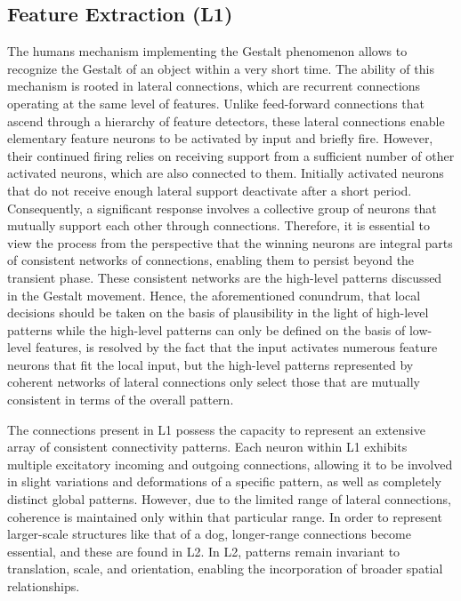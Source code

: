 \subsection{Feature Extraction (L1)}
The humans mechanism implementing the Gestalt phenomenon allows to recognize the Gestalt of an object within a very short time. The ability of this mechanism is rooted in lateral connections, which are recurrent connections operating at the same level of features. Unlike feed-forward connections that ascend through a hierarchy of feature detectors, these lateral connections enable elementary feature neurons to be activated by input and briefly fire. However, their continued firing relies on receiving support from a sufficient number of other activated neurons, which are also connected to them. Initially activated neurons that do not receive enough lateral support deactivate after a short period. Consequently, a significant response involves a collective group of neurons that mutually support each other through connections. Therefore, it is essential to view the process from the perspective that the winning neurons are integral parts of consistent networks of connections, enabling them to persist beyond the transient phase. These consistent networks are the high-level patterns discussed in the Gestalt movement. Hence, the aforementioned  conundrum, that local decisions should be taken on the basis of plausibility in the light of high-level patterns while the high-level patterns can only be defined on the basis of low-level features, is resolved by the fact that the input activates numerous feature neurons that fit the local input, but the high-level patterns represented by coherent networks of lateral connections only select those that are mutually consistent in terms of the overall pattern.

The connections present in L1 possess the capacity to represent an extensive array of consistent connectivity patterns. Each neuron within L1 exhibits multiple excitatory incoming and outgoing connections, allowing it to be involved in slight variations and deformations of a specific pattern, as well as completely distinct global patterns. However, due to the limited range of lateral connections, coherence is maintained only within that particular range. In order to represent larger-scale structures like that of a dog, longer-range connections become essential, and these are found in L2. In L2, patterns remain invariant to translation, scale, and orientation, enabling the incorporation of broader spatial relationships.

